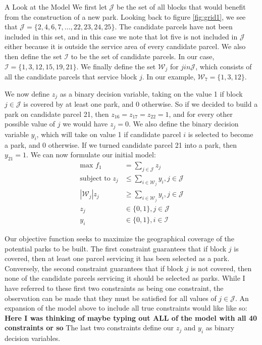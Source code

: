 \documentclass[12pt]{pom_thesis}
\begin{document}
\begin{chapter}{A Look at the Model}
	We first let $\mathcal{J}$ be the set of all blocks that would benefit from the construction of a new park. Looking back to figure \ref{fig:grid1}, we see that $\mathcal{J} = \{ 2,4,6,7, \dots, 22, 23, 24, 25\}$. The candidate parcels have not been included in this set, and in this case we note that lot five is not included in $\mathcal{J}$ either because it is outside the service area of every candidate parcel. We also then define the set $\mathcal{I}$ to be the set of candidate parcels. In our case, $\mathcal{I} = \{ 1,3,12,15,19,21\}$. We finally define the set $\mathcal{W}_j$ for $j in \mathcal{J}$, which consists of all the candidate parcels that service block $j$. In our example, $\mathcal{W}_7 = \{1,3,12\}$. \newline
	
	We now define $z_j$ as a binary decision variable, taking on the value 1 if block $j \in \mathcal{J}$ is covered by at least one park, and 0 otherwise. So if we decided to build a park on candidate parcel 21, then $z_{16} = z_{17} = z_{22} = 1$, and for every other possible value of $j$ we would have $z_j = 0$. We also define the binary decision variable $y_i$, which will take on value 1 if candidate parcel $i$ is selected to become a park, and 0 otherwise. If we turned candidate parcel 21 into a park, then $y_{21} = 1$. We can now formulate our initial model:
\begin{align*}
\textrm{max } f_1 &= \sum_{j \in \mathcal{J}} z_j \\
\textrm{subject to } z_j &\leq \sum_{i \in \mathcal{W}_j} y_i, j \in \mathcal{J}\\
\left|\mathcal{W}_j\right|z_j &\geq \sum_{i \in \mathcal{W}_j} y_i, j \in \mathcal{J} \\
z_j &\in \{0,1\}, j \in \mathcal{J} \\
y_i &\in \{0,1\}, i \in \mathcal{I}
\end{align*}

	Our objective function seeks to maximize the geographical coverage of the potential parks to be built. The first constraint guarantees that if block $j$ is covered, then at least one parcel servicing it has been selected as a park. Conversely, the second constraint guarantees that if block $j$ is not covered, then none of the candidate parcels servicing it should be selected as parks. While I have referred to these first two constraints as being one constraint, the observation can be made that they must be satisfied for all values of $j \in \mathcal{J}$. An expansion of the model above to include all true constraints would like like so:
	\newline\newline
 \textbf{Here I was thinking of maybe typing out ALL of the model with all 40 constraints or so}
	\newline\newline
	  The last two constraints define our $z_j$ and $y_i$ as binary decision variables.


\end{chapter}
\end{document}
